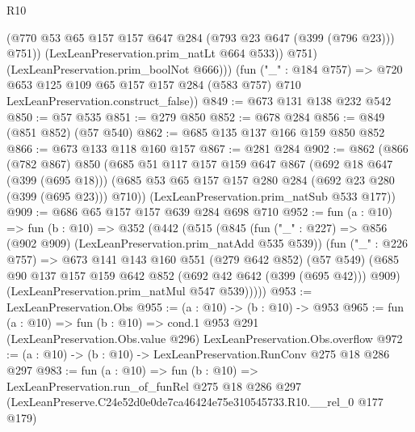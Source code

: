 \begin{lexlean}{R10}
\begin{coremodule}
                (@770 @53 @65 @157 @157 @647 @284 (@793 @23 @647 (@399 (@796 @23))) @751))
              (LexLeanPreservation.prim_natLt @664 @533))
            @751)
          (LexLeanPreservation.prim_boolNot @666)))
      (fun ("_" : @184 @757) =>
      @720 @653 @125 @109 @65 @157 @157 @284 (@583 @757) @710 LexLeanPreservation.construct_false))
@849 := @673 @131 @138 @232 @542
@850 := @57 @535
@851 := @279 @850
@852 := @678 @284
@856 := @849 (@851 @852) (@57 @540)
@862 := @685 @135 @137 @166 @159 @850 @852
@866 := @673 @133 @118 @160 @157
@867 := @281 @284
@902 := @862
    (@866
      (@782 @867)
      @850
      (@685
        @51
        @117
        @157
        @159
        @647
        @867
        (@692 @18 @647 (@399 (@695 @18)))
        (@685 @53 @65 @157 @157 @280 @284 (@692 @23 @280 (@399 (@695 @23))) @710))
      (LexLeanPreservation.prim_natSub @533 @177))
@909 := @686 @65 @157 @157 @639 @284 @698 @710
@952 := fun (a : @10) =>
  fun (b : @10) =>
  @352
    (@442
      (@515
        (@845
          (fun ("_" : @227) => @856 (@902 @909) (LexLeanPreservation.prim_natAdd @535 @539))
          (fun ("_" : @226 @757) =>
          @673
            @141
            @143
            @160
            @551
            (@279 @642 @852)
            (@57 @549)
            (@685 @90 @137 @157 @159 @642 @852 (@692 @42 @642 (@399 (@695 @42))) @909)
            (LexLeanPreservation.prim_natMul @547 @539)))))
@953 := LexLeanPreservation.Obs
@955 := (a : @10) -> (b : @10) -> @953
@965 := fun (a : @10) =>
  fun (b : @10) =>
  cond.{1} @953 @291 (LexLeanPreservation.Obs.value @296) LexLeanPreservation.Obs.overflow
@972 := (a : @10) -> (b : @10) -> LexLeanPreservation.RunConv @275 @18 @286 @297
@983 := fun (a : @10) =>
  fun (b : @10) =>
  LexLeanPreservation.run_of_funRel
    @275
    @18
    @286
    @297
    (LexLeanPreserve.C24e52d0e0de7ca46424e75e310545733.R10.__rel_0 @177 @179)
\end{coremodule}
\end{lexlean}
